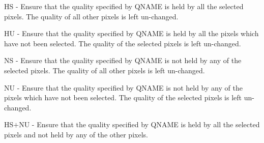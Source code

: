 \begin{small}
{{{         HS - Ensure that the quality specified by QNAME is held by
              all the selected pixels. The quality of all other
              pixels is left un-changed.

         HU - Ensure that the quality specified by QNAME is held by all
              the pixels which have not been selected. The quality of
              the selected pixels is left un-changed.

         NS - Ensure that the quality specified by QNAME is not held by
              any of the selected pixels. The quality of all other
              pixels is left un-changed.

         NU - Ensure that the quality specified by QNAME is not held by
              any of the pixels which have not been selected. The
              quality of the selected pixels is left un-changed.

         HS$+$NU - Ensure that the quality specified by QNAME is held by
              all the selected pixels and not held by any of the other
              pixels.

}}}
\end{small}
